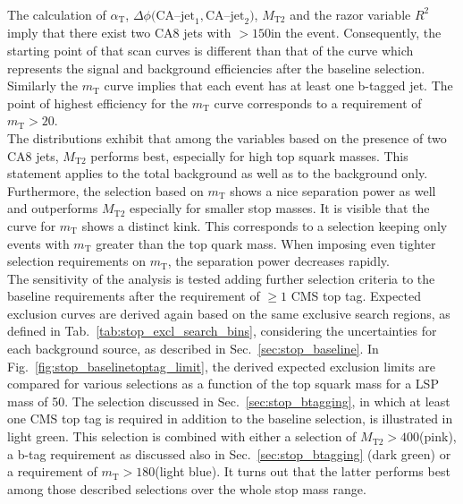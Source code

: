 \\
The calculation of $\alpha_\mathrm{T}$, $\Delta \phi(\mathrm{CA}$--$\mathrm{jet}_1, \mathrm{CA}$--$\mathrm{jet}_2)$, $M_\mathrm{T2}$ and the razor variable $R^2$ imply that there exist two CA8 jets with \pt$> 150$\gev in the event. Consequently, the starting point of that scan curves is different than that of the \met curve which represents the signal and background efficiencies after the baseline selection. Similarly the $m_\mathrm{T}$ curve implies that each event has at least one b-tagged jet. The point of highest efficiency for the $m_\mathrm{T}$ curve corresponds to a requirement of $m_\mathrm{T} > 20$\gev.  \\
The distributions exhibit that among the variables based on the presence of two CA8 jets, $M_\mathrm{T2}$ performs best, especially for high top squark masses. This statement applies to the total background as well as to the \ttbar background only. Furthermore, the selection based on $m_\mathrm{T}$ shows a nice separation power as well and outperforms $M_\mathrm{T2}$ especially for smaller stop masses. It is visible that the curve for $m_\mathrm{T}$ shows a distinct kink. This corresponds to a selection keeping only events with $m_\mathrm{T}$ greater than the top quark mass. When imposing even tighter selection requirements on $m_\mathrm{T}$, the separation power decreases rapidly. \\ 
The sensitivity of the analysis is tested adding further selection criteria to the baseline requirements after the requirement of $\ge 1$ CMS top tag. Expected exclusion curves are derived again based on the same exclusive search regions, as defined in Tab.~\ref{tab:stop_excl_search_bins}, considering the uncertainties for each background source, as described in Sec.~\ref{sec:stop_baseline}. In Fig.~\ref{fig:stop_baselinetoptag_limit}, the derived expected exclusion limits are compared for various selections as a function of the top squark mass for a LSP mass of 50\gev. The selection discussed in Sec.~\ref{sec:stop_btagging}, in which at least one CMS top tag is required in addition to the baseline selection, is illustrated in light green. This selection is combined with either a selection of $M_\mathrm{T2} > 400$\gev (pink), a b-tag requirement as discussed also in Sec.~\ref{sec:stop_btagging} (dark green) or a requirement of $m_\mathrm{T} > 180$\gev (light blue). It turns out that the latter performs best among those described selections over the whole stop mass range. 
